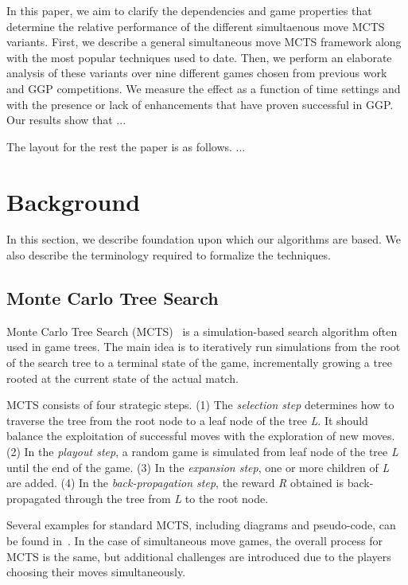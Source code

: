 \documentclass[conference]{IEEEtran}
\begin{document}
In this paper, we aim to clarify the dependencies and game properties that determine the relative performance of the different 
simultaenous move MCTS variants. First, we describe a general simultaneous move MCTS framework along with the most popular 
techniques used to date. Then, we perform an 
elaborate analysis of these variants over nine different games chosen from previous work and GGP competitions. We measure 
the effect as a function of time settings and with the presence or lack of enhancements that have proven successful in GGP. 
Our results show that ...

The layout for the rest the paper is as follows. ...

\section{Background}
\label{sec:background}

In this section, we describe foundation upon which our algorithms are based. 
We also describe the terminology required to formalize the techniques. 

\subsection{Monte Carlo Tree Search}

Monte Carlo Tree Search (MCTS)~\cite{Coulom06Efficient,Kocsis06Bandit} is a simulation-based search algorithm often 
used in game trees. The main idea is to iteratively run simulations from the root of the search tree to a terminal 
state of the game, incrementally growing a tree rooted at the current state of the actual match. 

MCTS consists of four strategic steps. (1) The \textit{selection step} determines how to traverse the tree from the 
root node to a leaf node of the tree \textit{L}. It should balance the exploitation of successful moves with the 
exploration of new moves. (2) In the \textit{playout step}, a random game is simulated from leaf node of the tree 
\textit{L} until the end of the game.  (3) In the \textit{expansion step}, one or more children of \textit{L} are 
added. (4) In the \textit{back-propagation step}, the reward \textit{R} obtained is back-propagated through the tree 
from \textit{L} to the root node.

Several examples for standard MCTS, including diagrams and pseudo-code, can be found in~\cite{Browne12MCTSSurvey}.
In the case of simultaneous move games, the overall process for MCTS is the same, but additional challenges are 
introduced due to the players choosing their moves simultaneously.
\end{document}
